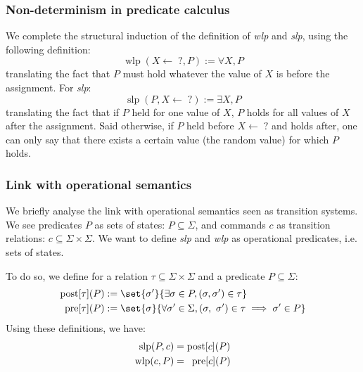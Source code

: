 \documentclass[toc, titlepaged]{../cs-classes/cs-classes}
\DeclareMathOperator{\wlp}{wlp}
\DeclareMathOperator{\slp}{slp}
\begin{document}
\subsubsection{Non-determinism in predicate calculus}
We complete the structural induction of the definition of \emph{wlp} and \emph{slp}, using the following definition:
\begin{equation*}
    \wlp(X\leftarrow\;?, P) := \forall X, P
\end{equation*}
translating the fact that $P$ must hold whatever the value of $X$ is before the assignment. For \emph{slp}:
\begin{equation*}
    \slp(P, X\leftarrow\;?) := \exists X, P
\end{equation*}
translating the fact that if $P$ held for one value of $X$, $P$ holds for all values of $X$ after the assignment. Said otherwise, if $P$ held before $X\leftarrow\;?$ and holds after, one can only say that there exists a certain value (the random value) for which $P$ holds.

\subsubsection{Link with operational semantics}
We briefly analyse the link with operational semantics seen as transition systems. We see predicates $P$ as sets of states: $P\subseteq\Sigma$, and commands $c$ as transition relations: $c\subseteq\Sigma\times\Sigma$. We want to define \emph{slp} and \emph{wlp} as operational predicates, i.e. sets of states. 

To do so, we define for a relation $\tau\subseteq\Sigma\times\Sigma$ and a predicate $P\subseteq\Sigma$:
\begin{equation*}
    \begin{aligned}
        \textnormal{post}[\tau](P) &:= \set{\sigma'}{\exists\sigma\in P, (\sigma, \sigma')\in\tau}\\
        \textnormal{pre}[\tau](P) &:= \set{\sigma}{\forall\sigma'\in\Sigma, (\sigma, \sigma')\in\tau\implies\sigma'\in P}
    \end{aligned}
\end{equation*}
Using these definitions, we have:
\begin{equation*}
    \begin{aligned}
        \slp(P, c) &= \textnormal{post}[c](P)\\
        \wlp(c, P) &= \phantom{p}\textnormal{pre}[c](P)
    \end{aligned}
\end{equation*}
\end{document}
